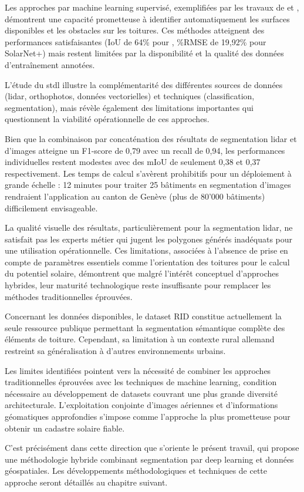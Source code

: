 \par{Les approches par machine learning supervisé, exemplifiées par les travaux de \citeauthor{castello_quantification_2021} et \citeauthor{li_deep_2024}, démontrent une capacité prometteuse à identifier automatiquement les surfaces disponibles et les obstacles sur les toitures. Ces méthodes atteignent des performances satisfaisantes (IoU de 64\% pour \citeauthor{castello_quantification_2021}, \%RMSE de 19,92\% pour SolarNet+) mais restent limitées par la disponibilité et la qualité des données d'entraînement annotées.}

L'étude du \acrshort{stdl} illustre la complémentarité des différentes sources de données (\gls{lidar}, orthophotos, données vectorielles) et techniques (classification, segmentation), mais révèle également des limitations importantes qui questionnent la viabilité opérationnelle de ces approches. 

Bien que la combinaison par concaténation des résultats de segmentation \gls{lidar} et d'images atteigne un F1-score de 0,79 avec un recall de 0,94, les performances individuelles restent modestes avec des mIoU de seulement 0,38 et 0,37 respectivement. Les temps de calcul s'avèrent prohibitifs pour un déploiement à grande échelle : 12 minutes pour traiter 25 bâtiments en segmentation d'images rendraient l'application au canton de Genève (plus de 80'000 bâtiments) difficilement envisageable.

La qualité visuelle des résultats, particulièrement pour la segmentation \gls{lidar}, ne satisfait pas les experts métier qui jugent les polygones générés inadéquats pour une utilisation opérationnelle. Ces limitations, associées à l'absence de prise en compte de paramètres essentiels comme l'orientation des toitures pour le calcul du potentiel solaire, démontrent que malgré l'intérêt conceptuel d'approches hybrides, leur maturité technologique reste insuffisante pour remplacer les méthodes traditionnelles éprouvées.

Concernant les données disponibles, le dataset RID constitue actuellement la seule ressource publique permettant la segmentation sémantique complète des éléments de toiture. Cependant, sa limitation à un contexte rural allemand restreint sa généralisation à d'autres environnements urbains.

Les limites identifiées pointent vers la nécessité de combiner les approches traditionnelles éprouvées avec les techniques de machine learning, condition nécessaire au développement de datasets couvrant une plus grande diversité architecturale. L'exploitation conjointe d'images aériennes et d'informations géomatiques approfondies s'impose comme l'approche la plus prometteuse pour obtenir un cadastre solaire fiable.

C'est précisément dans cette direction que s'oriente le présent travail, qui propose une méthodologie hybride combinant segmentation par deep learning et données géospatiales. Les développements méthodologiques et techniques de cette approche seront détaillés au chapitre suivant.